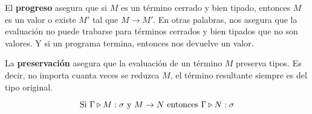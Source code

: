 El \textbf{progreso} asegura que si $M$ es un término cerrado y bien tipado, entonces $M$ es un valor o existe $M'$ tal que $M\to M'$. En otras palabras, nos asegura que la evaluación no puede trabarse para términos cerrados y bien tipados que no son valores. Y si un programa termina, entonces nos devuelve un valor.

La \textbf{preservación} asegura que la evaluación de un término $M$ preserva tipos. Es decir, no importa cuanta veces se reduzca $M$, el término resultante siempre es del tipo original.

$$\text{Si } \Gamma\triangleright M : \sigma \text{ y } M\to N \text{ entonces } \Gamma\triangleright N : \sigma$$	

